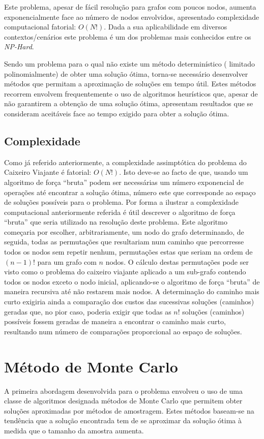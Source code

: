 \documentclass{article}
\begin{document}
Este problema, apesar de fácil resolução para grafos com poucos nodos, aumenta exponencialmente face ao número de nodos envolvidos, apresentado complexidade
computacional fatorial: $O(N!)$. Dada a sua aplicabilidade em diversos contextos/cenários este problema é um dos problemas mais conhecidos entre os \textit{NP-Hard}.

Sendo um problema para o qual não existe um método determinístico ( limitado polinomialmente) de obter uma solução ótima, torna-se necessário desenvolver métodos
que permitam a aproximação de soluções em tempo útil. Estes métodos recorrem envolvem frequentemente o uso de algoritmos heurísticos que, apesar de não 
garantirem a obtenção de uma solução ótima, apresentam resultados que se consideram aceitáveis face ao tempo exigido para obter a solução ótima.

\subsection{Complexidade}
Como já referido anteriormente, a complexidade assimptótica do problema do Caixeiro Viajante é fatorial: $O(N!)$. Isto deve-se ao facto de que, usando um algoritmo de 
força ``bruta'' podem ser necessárias um número exponencial de operações até encontrar a solução ótima, número este que corresponde ao espaço de soluções possíveis
para o problema. Por forma a ilustrar a complexidade computacional anteriormente referida é útil descrever o algoritmo de força ``bruta'' que seria utilizado
na resolução deste problema. Este algoritmo começaria por escolher, arbitrariamente, um nodo do grafo determinando, de seguida, todas as permutações que resultariam
num caminho que percorresse todos os nodos sem repetir nenhum, permutações estas que seriam na ordem de $(n-1)!$ para um grafo com $n$ nodos. O cálculo destas 
permutações pode ser visto como o problema do caixeiro viajante aplicado a um sub-grafo contendo todos os nodos exceto o nodo inicial, aplicando-se o algoritmo de 
força ``bruta'' de maneira recursiva até não restarem mais nodos. A determinação do caminho mais curto exigiria ainda a comparação dos custos das sucessivas soluções 
(caminhos) geradas que, no pior caso, poderia exigir que todas as $n!$ soluções (caminhos) possíveis fossem geradas de maneira a encontrar o caminho mais curto, 
resultando num número de comparações proporcional ao espaço de soluções.

\section{Método de Monte Carlo}
A primeira abordagem desenvolvida para o problema envolveu o uso de uma classe de algoritmos designada métodos de Monte Carlo que permitem obter soluções aproximadas
por métodos de amostragem. Estes métodos baseam-se na tendência que a solução encontrada tem de se aproximar da solução ótima à medida que o tamanho da amostra 
aumenta. 
\end{document}
